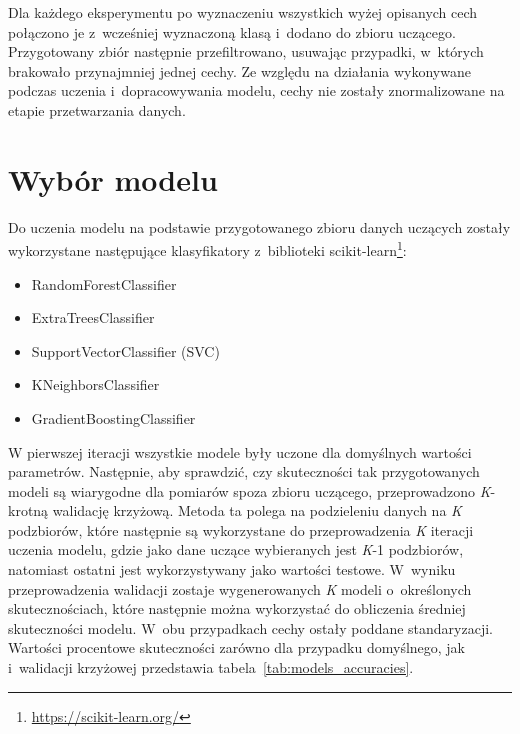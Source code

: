 Dla każdego eksperymentu po wyznaczeniu wszystkich wyżej opisanych cech połączono je z~wcześniej wyznaczoną klasą i~dodano do zbioru uczącego. Przygotowany zbiór następnie przefiltrowano, usuwając przypadki, w~których brakowało przynajmniej jednej cechy. Ze względu na działania wykonywane podczas uczenia i~dopracowywania modelu, cechy nie zostały znormalizowane na etapie przetwarzania danych.

\section{Wybór modelu}
Do uczenia modelu na podstawie przygotowanego zbioru danych uczących zostały wykorzystane następujące klasyfikatory z~biblioteki scikit-learn\footnote{\url{https://scikit-learn.org/}}:
\begin{itemize}
	\item RandomForestClassifier
	\item ExtraTreesClassifier
	\item SupportVectorClassifier (SVC)
	\item KNeighborsClassifier
	\item GradientBoostingClassifier
\end{itemize}

W pierwszej iteracji wszystkie modele były uczone dla domyślnych wartości parametrów. Następnie, aby sprawdzić, czy skuteczności tak przygotowanych modeli są wiarygodne dla pomiarów spoza zbioru uczącego, przeprowadzono \textit{K}-krotną walidację krzyżową. Metoda ta polega na podzieleniu danych na \textit{K} podzbiorów, które następnie są wykorzystane do przeprowadzenia \textit{K} iteracji uczenia modelu, gdzie jako dane uczące wybieranych jest \textit{K}-1 podzbiorów, natomiast ostatni jest wykorzystywany jako wartości testowe. W~wyniku przeprowadzenia walidacji zostaje wygenerowanych \textit{K} modeli o~określonych skutecznościach, które następnie można wykorzystać do obliczenia średniej skuteczności modelu. W~obu przypadkach cechy ostały poddane standaryzacji. Wartości procentowe skuteczności zarówno dla przypadku domyślnego, jak i~walidacji krzyżowej przedstawia tabela~\ref{tab:models_accuracies}.

